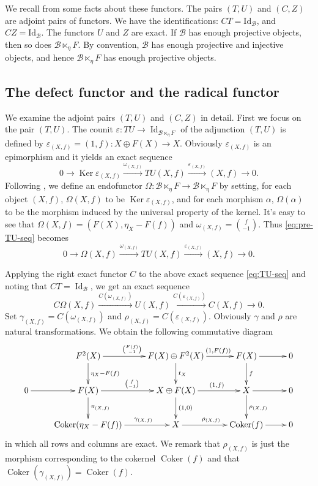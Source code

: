 \documentclass[11pt,reqno]{amsart}
\numberwithin{equation}{section}
\newcommand{\cB}{\mathcal B}
\newcommand{\Coker}{\operatorname{Coker}}
\newcommand{\Ker}{\operatorname{Ker}}
\newcommand{\Id}{\operatorname{Id}}
\begin{document}
We recall from \cite{Beligiannis} some facts about these functors.
The pairs $(T,U)$ and $(C,Z)$ are adjoint pairs of functors. We have the identifications: $CT=\mathrm{Id}_{\cB}$, and $CZ=\mathrm{Id}_{\cB}$.
The functors $U$ and $Z$ are exact.
If $\cB$ has enough projective objects, then so does $\cB\ltimes_\eta F$. By convention,
$\cB$ has enough projective and injective objects, and hence $\cB\ltimes_\eta F$
has enough projective objects.

\vspace{-1.3\baselineskip}
\subsection{The defect functor and the radical functor}
We examine the adjoint pairs $(T,U)$ and $(C,Z)$ in detail.
First we focus on the pair $(T,U)$. The counit $\varepsilon\colon TU\to \Id_{\cB\ltimes_\eta F}$ of the adjunction $(T,U)$ is defined by
$\varepsilon_{(X,f)}=(1,f)\colon X\oplus F(X)\to X$. Obviously $\varepsilon_{(X,f)}$ is an epimorphism and it yields an exact sequence
\begin{equation}\label{eq:pre-TU-seq}
0\rightarrow \Ker\varepsilon_{(X,f)}\xrightarrow{\omega_{(X,f)}} TU(X,f)\xrightarrow{\varepsilon_{(X,f)}} (X,f)\rightarrow 0.
\end{equation}
Following \cite[Subsection~5.1]{Beligiannis}, we define an endofunctor $\Omega\colon \cB\ltimes_\eta F\to \cB\ltimes_\eta F$ by setting, for each object
$(X,f)$, $\Omega(X,f)$ to be $\Ker\varepsilon_{(X,f)}$, and for each morphism $\alpha$,
$\Omega(\alpha)$ to be the morphism induced by the universal property of the kernel. It's easy to see that
$\Omega(X,f)=(F(X),\eta_X-F(f))$ and $\omega_{(X,f)}=\binom{f}{-1}$. Thus \eqref{eq:pre-TU-seq} becomes
\begin{equation}\label{eq:TU-seq}
0\rightarrow \Omega(X,f)\xrightarrow{\omega_{(X,f)}} TU(X,f)\xrightarrow{\varepsilon_{(X,f)}} (X,f)\rightarrow 0.
\end{equation}

Applying the right exact functor $C$ to the above exact sequence \eqref{eq:TU-seq} and noting that $CT=\Id_{\cB}$, we get an exact sequence
\begin{equation}\label{eq:pre-delta-seq}
C\Omega(X,f)\xrightarrow{C(\omega_{(X,f)})} U(X,f)\xrightarrow{C(\varepsilon_{(X,f)})} C(X,f)\rightarrow 0.
\end{equation}
Set $\gamma_{(X,f)}=C(\omega_{(X,f)})$ and $\rho_{(X,f)}=C(\varepsilon_{(X,f)})$. Obviously $\gamma$ and $\rho$ are natural transformations.
We obtain the following commutative diagram
\[
\xymatrix{
& F^2(X) \ar[r]^{\binom{F(f)}{-1}} \ar[d]^{\eta_{X}-F(f)} & F(X)\oplus F^2(X) \ar[r]^{\ \ \ \ \ (1,F(f))}\ar[d]^{t_X} & F(X)\ar[d]^{f} \ar[r] & 0\\
0\ar[r] & F(X) \ar[r]^{\binom{f}{-1}} \ar[d]^{\pi_{(X,f)}} & X\oplus F(X) \ar[r]^{\ \ \ \ (1,f)} \ar[d]^{(1,0)} & X \ar[r] \ar[d]^{\rho_{(X,f)}} & 0\\
& \Coker(\eta_X-F(f)) \ar[r]^{\ \ \ \ \ \ \ \ \gamma_{(X,f)}} & X \ar[r]^{\rho_{(X,f)}} & \Coker(f) \ar[r] & 0
}
\]
in which all rows and columns are exact. We remark that $\rho_{(X,f)}$ is just the morphism corresponding to the cokernel $\Coker(f)$ and that
$\Coker(\gamma_{(X,f)})=\Coker(f)$.
\end{document}
